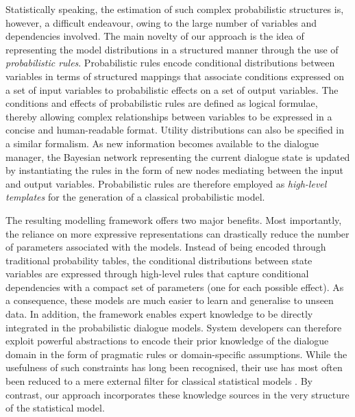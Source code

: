 Statistically speaking, the estimation of such complex probabilistic structures is, however, a difficult endeavour, owing to the large number of variables and dependencies involved. The main novelty of our approach is the idea of representing the model distributions in a structured manner through the use of  \textit{probabilistic rules}.  Probabilistic rules encode conditional distributions between variables in terms of structured mappings that associate conditions expressed on a set of input variables to probabilistic effects on a set of output variables. The conditions and effects of probabilistic rules are defined as logical formulae, thereby allowing complex relationships between variables to be expressed in a concise and human-readable format.  Utility distributions can also be specified in a similar formalism. As new information becomes available to the dialogue manager, the Bayesian network representing the current dialogue state is updated by instantiating the rules in the form of new nodes mediating between the input and output variables. Probabilistic rules are therefore employed as \textit{high-level templates} for the generation of a classical probabilistic model.  

The resulting modelling framework offers two major benefits. Most importantly, the reliance on more expressive representations can drastically reduce the number of parameters associated with the models.  Instead of being encoded through traditional probability tables, the conditional distributions between state variables are expressed through high-level rules that capture conditional dependencies with a compact set of parameters (one for each possible effect). As a consequence, these models are much easier to learn and generalise to unseen data.  In addition, the framework enables expert knowledge to be directly integrated in the probabilistic dialogue models. System developers can therefore exploit powerful abstractions to encode their prior knowledge of the dialogue domain in the form of pragmatic rules or domain-specific assumptions.   While the usefulness of such constraints has long been recognised, their use has most often been reduced to a mere external filter for classical statistical models \citep{heeman2007,williams2008}. By contrast, our approach incorporates these knowledge sources in the very structure of the statistical model. 

